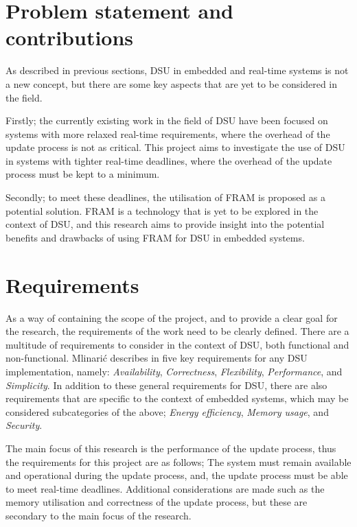 \section{Problem statement and contributions}
As described in previous sections, DSU in embedded and real-time systems is not a new concept, but there are some key aspects that are yet to be considered in the field. 

Firstly; the currently existing work in the field of DSU have been focused on systems with more relaxed real-time requirements, where the overhead of the update process is not as critical. This project aims to investigate the use of DSU in systems with tighter real-time deadlines, where the overhead of the update process must be kept to a minimum.

Secondly; to meet these deadlines, the utilisation of FRAM is proposed as a potential solution. FRAM is a technology that is yet to be explored in the context of DSU, and this research aims to provide insight into the potential benefits and drawbacks of using FRAM for DSU in embedded systems.

\section{Requirements}
As a way of containing the scope of the project, and to provide a clear goal for the research, the requirements of the work need to be clearly defined. There are a multitude of requirements to consider in the context of DSU, both functional and non-functional. Mlinarić describes in \cite{dsuChallenges} five key requirements for any DSU implementation, namely: \textit{Availability}, \textit{Correctness}, \textit{Flexibility}, \textit{Performance}, and \textit{Simplicity}. In addition to these general requirements for DSU, there are also requirements that are specific to the context of embedded systems, which may be considered subcategories of the above; \textit{Energy efficiency}, \textit{Memory usage}, and \textit{Security}.

The main focus of this research is the performance of the update process, thus the requirements for this project are as follows; The system must remain available and operational during the update process, and, the update process must be able to meet real-time deadlines. Additional considerations are made such as the memory utilisation and correctness of the update process, but these are secondary to the main focus of the research.
